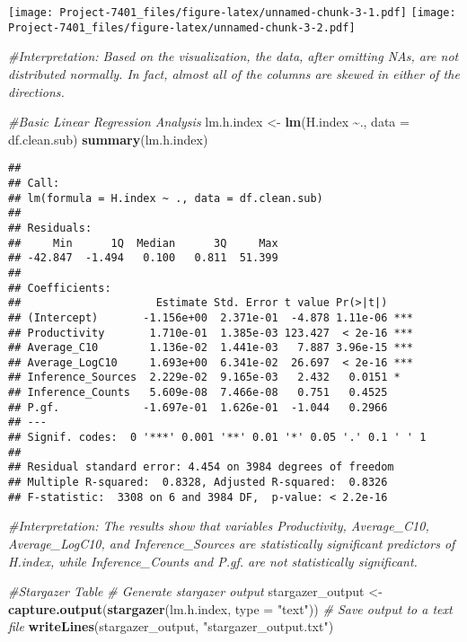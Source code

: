 \documentclass[
]{article}
\newenvironment{Shaded}{\begin{snugshade}}{\end{snugshade}}
\newcommand{\AttributeTok}[1]{\textcolor[rgb]{0.13,0.29,0.53}{#1}}
\newcommand{\CommentTok}[1]{\textcolor[rgb]{0.56,0.35,0.01}{\textit{#1}}}
\newcommand{\FunctionTok}[1]{\textcolor[rgb]{0.13,0.29,0.53}{\textbf{#1}}}
\newcommand{\NormalTok}[1]{#1}
\newcommand{\OtherTok}[1]{\textcolor[rgb]{0.56,0.35,0.01}{#1}}
\newcommand{\SpecialCharTok}[1]{\textcolor[rgb]{0.81,0.36,0.00}{\textbf{#1}}}
\newcommand{\StringTok}[1]{\textcolor[rgb]{0.31,0.60,0.02}{#1}}
\begin{document}
\texttt{[image: Project-7401\_files/figure-latex/unnamed-chunk-3-1.pdf]}
\texttt{[image: Project-7401\_files/figure-latex/unnamed-chunk-3-2.pdf]}

\begin{Shaded}
\begin{Highlighting}[]
\CommentTok{\#Interpretation: Based on the visualization, the data, after omitting NAs, are not distributed normally. In fact, almost all of the columns are skewed in either of the directions. }
\end{Highlighting}
\end{Shaded}

\begin{Shaded}
\begin{Highlighting}[]
\CommentTok{\#Basic Linear Regression Analysis}
\NormalTok{lm.h.index }\OtherTok{\textless{}{-}} \FunctionTok{lm}\NormalTok{(H.index }\SpecialCharTok{\textasciitilde{}}\NormalTok{., }\AttributeTok{data =}\NormalTok{ df.clean.sub)}
\FunctionTok{summary}\NormalTok{(lm.h.index)}
\end{Highlighting}
\end{Shaded}

\begin{verbatim}
## 
## Call:
## lm(formula = H.index ~ ., data = df.clean.sub)
## 
## Residuals:
##     Min      1Q  Median      3Q     Max 
## -42.847  -1.494   0.100   0.811  51.399 
## 
## Coefficients:
##                     Estimate Std. Error t value Pr(>|t|)    
## (Intercept)       -1.156e+00  2.371e-01  -4.878 1.11e-06 ***
## Productivity       1.710e-01  1.385e-03 123.427  < 2e-16 ***
## Average_C10        1.136e-02  1.441e-03   7.887 3.96e-15 ***
## Average_LogC10     1.693e+00  6.341e-02  26.697  < 2e-16 ***
## Inference_Sources  2.229e-02  9.165e-03   2.432   0.0151 *  
## Inference_Counts   5.609e-08  7.466e-08   0.751   0.4525    
## P.gf.             -1.697e-01  1.626e-01  -1.044   0.2966    
## ---
## Signif. codes:  0 '***' 0.001 '**' 0.01 '*' 0.05 '.' 0.1 ' ' 1
## 
## Residual standard error: 4.454 on 3984 degrees of freedom
## Multiple R-squared:  0.8328, Adjusted R-squared:  0.8326 
## F-statistic:  3308 on 6 and 3984 DF,  p-value: < 2.2e-16
\end{verbatim}

\begin{Shaded}
\begin{Highlighting}[]
\CommentTok{\#Interpretation: The results show that variables Productivity, Average\_C10, Average\_LogC10, and Inference\_Sources are statistically significant predictors of H.index, while Inference\_Counts and P.gf. are not statistically significant. }

\CommentTok{\#Stargazer Table}
\CommentTok{\# Generate stargazer output}
\NormalTok{stargazer\_output }\OtherTok{\textless{}{-}} \FunctionTok{capture.output}\NormalTok{(}\FunctionTok{stargazer}\NormalTok{(lm.h.index, }\AttributeTok{type =} \StringTok{"text"}\NormalTok{))}
\CommentTok{\# Save output to a text file}
\FunctionTok{writeLines}\NormalTok{(stargazer\_output, }\StringTok{"stargazer\_output.txt"}\NormalTok{)}
\end{Highlighting}
\end{Shaded}
\end{document}
